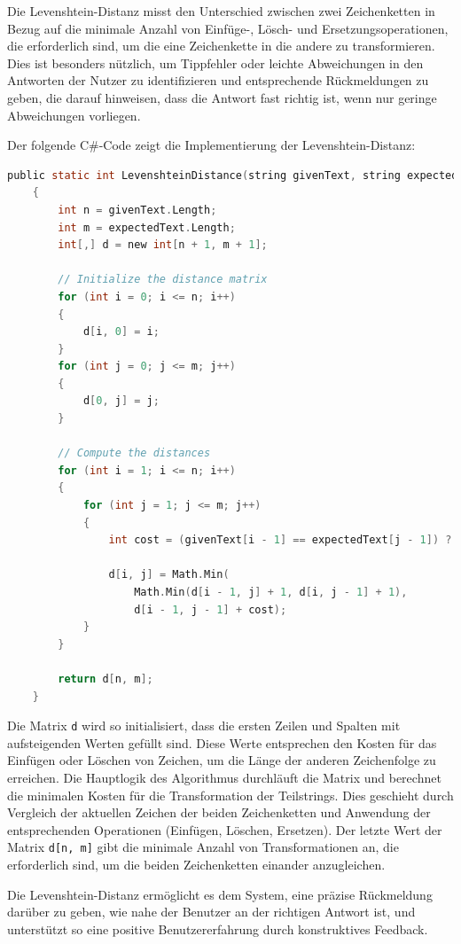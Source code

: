 Die Levenshtein-Distanz misst den Unterschied zwischen zwei Zeichenketten in Bezug auf die minimale Anzahl von Einfüge-, Lösch- und Ersetzungsoperationen, die erforderlich sind, um die eine Zeichenkette in die andere zu transformieren. Dies ist besonders nützlich, um Tippfehler oder leichte Abweichungen in den Antworten der Nutzer zu identifizieren und entsprechende Rückmeldungen zu geben, die darauf hinweisen, dass die Antwort fast richtig ist, wenn nur geringe Abweichungen vorliegen.

Der folgende C\#-Code zeigt die Implementierung der Levenshtein-Distanz:
\newpage
\begin{lstlisting}[language=c,caption={Code Ausschnitt zum Levenshtein Distanz Algorithmus in C\#}]
public static int LevenshteinDistance(string givenText, string expectedText)
    {
        int n = givenText.Length;
        int m = expectedText.Length;
        int[,] d = new int[n + 1, m + 1];

        // Initialize the distance matrix
        for (int i = 0; i <= n; i++)
        {
            d[i, 0] = i;
        }
        for (int j = 0; j <= m; j++)
        {
            d[0, j] = j;
        }

        // Compute the distances
        for (int i = 1; i <= n; i++)
        {
            for (int j = 1; j <= m; j++)
            {
                int cost = (givenText[i - 1] == expectedText[j - 1]) ? 0 : 1;

                d[i, j] = Math.Min(
                    Math.Min(d[i - 1, j] + 1, d[i, j - 1] + 1),
                    d[i - 1, j - 1] + cost);
            }
        }

        return d[n, m];
    }
\end{lstlisting}
Die Matrix \lstinline{d} wird so initialisiert, dass die ersten Zeilen und Spalten mit aufsteigenden Werten gefüllt sind. Diese Werte entsprechen den Kosten für das Einfügen oder Löschen von Zeichen, um die Länge der anderen Zeichenfolge zu erreichen. Die Hauptlogik des Algorithmus durchläuft die Matrix und berechnet die minimalen Kosten für die Transformation der Teilstrings. Dies geschieht durch Vergleich der aktuellen Zeichen der beiden Zeichenketten und Anwendung der entsprechenden Operationen (Einfügen, Löschen, Ersetzen). Der letzte Wert der Matrix \lstinline{d[n, m]} gibt die minimale Anzahl von Transformationen an, die erforderlich sind, um die beiden Zeichenketten einander anzugleichen.

Die Levenshtein-Distanz ermöglicht es dem System, eine präzise Rückmeldung darüber zu geben, wie nahe der Benutzer an der richtigen Antwort ist, und unterstützt so eine positive Benutzererfahrung durch konstruktives Feedback.

